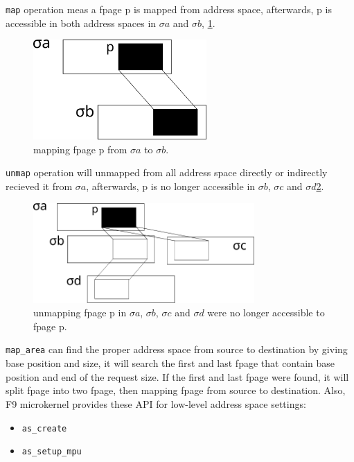 \documentclass[10pt,preprint,nocopyrightspace]{sigplanconf}
\begin{document}
\verb|map| operation meas a fpage p is mapped from address space, afterwards, p is accessible in both address spaces in $\sigma{a}$ and $\sigma{b}$, \ref{fig:map}.

\begin{figure}[H]
	\begin{center}
		\includegraphics[height=1.5in]{picture/map.png}
	\end{center}
	\caption{mapping fpage p from $\sigma{a}$ to $\sigma{b}$.}
	\label{fig:map}
\end{figure}


\verb|unmap| operation will unmapped from all address space directly or indirectly recieved it from $\sigma{a}$, afterwards, p is no longer accessible in $\sigma{b}$, $\sigma{c}$ and $\sigma{d}$\ref{fig:unmap}.

\begin{figure}[H]
	\begin{center}
		\includegraphics[height=1.5in]{picture/unmap.png}
	\end{center}
	\caption{unmapping fpage p in $\sigma{a}$, $\sigma{b}$, $\sigma{c}$ and $\sigma{d}$ were no longer accessible to fpage p.}
	\label{fig:unmap}
\end{figure}



\verb|map_area| can find the proper address space from source to destination by giving base position and size, it will search the first and last fpage that contain base position and end of the request size. If the first and last fpage were found, it will split fpage into two fpage, then mapping fpage from source to destination. Also, F9 microkernel provides these API for low-level address space settings:
\begin{itemize}
\item \verb|as_create|
\item \verb|as_setup_mpu|
\end{itemize}
\end{document}
